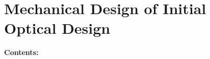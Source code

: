 
\chapter{Mechanical Design of Initial Optical Design} %

\noindent\textbf{\large Contents:}

\noindent\hrulefill
\noindent\startcontents[chapters]
\noindent{}
\noindent\hrulefill

\label{Chapter2} %
